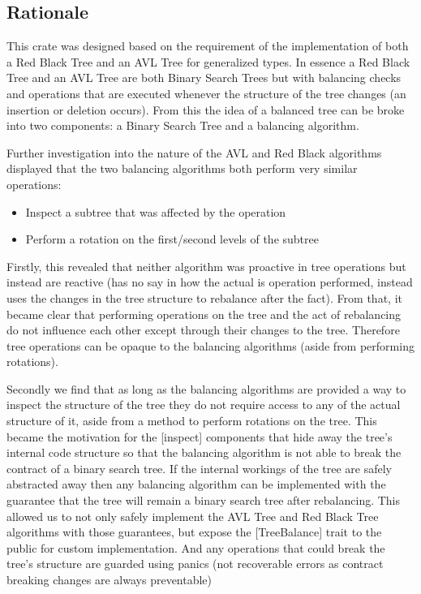 \documentclass[11pt, letterpaper]{article}
\begin{document}
\subsection{Rationale}

This crate was designed based on the requirement of the implementation of both a Red Black Tree and an AVL Tree
for generalized types.  In essence a Red Black Tree and an AVL Tree are both Binary Search Trees but with balancing checks
and operations that are executed whenever the structure of the tree changes (an insertion or deletion occurs).
From this the idea of a balanced tree can be broke into two components: a Binary Search Tree and a balancing algorithm.

Further investigation into the nature of the AVL and Red Black algorithms displayed that the two balancing algorithms both perform very similar operations:
\begin{itemize}
    \item Inspect a subtree that was affected by the operation
    \item Perform a rotation on the first/second levels of the subtree
\end{itemize}

Firstly, this revealed that neither algorithm was proactive in tree operations but instead are reactive
(has no say in how the actual is operation performed, instead uses the changes in the tree structure to rebalance after the fact).
From that, it became clear that performing operations on the tree and the act of rebalancing do not influence each other except through
their changes to the tree.  Therefore tree operations can be opaque to the balancing algorithms (aside from performing rotations).

Secondly we find that as long as the balancing algorithms are provided a way to inspect the structure of the tree they do not require
access to any of the actual structure of it, aside from a method to perform rotations on the tree.  This became the motivation for
the [inspect] components that hide away the tree's internal code structure so that the balancing algorithm is not able to break
the contract of a binary search tree.  If the internal workings of the tree are safely abstracted away then any balancing algorithm can
be implemented with the guarantee that the tree will remain a binary search tree after rebalancing.  This allowed us to not only safely implement
the AVL Tree and Red Black Tree algorithms with those guarantees, but expose the [TreeBalance] trait to the public for custom implementation.
And any operations that could break the tree's structure are guarded using panics (not recoverable errors as contract breaking changes are always preventable)
\end{document}
